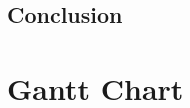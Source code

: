 \documentclass{article} %
\begin{document}
\begin{multicols}{2}
\section{Conclusion}

\label{last_page}

\newpage




\end{multicols}

\newpage
\appendix

\section{Gantt Chart}
\label{app: appendix_a}
\end{document}
